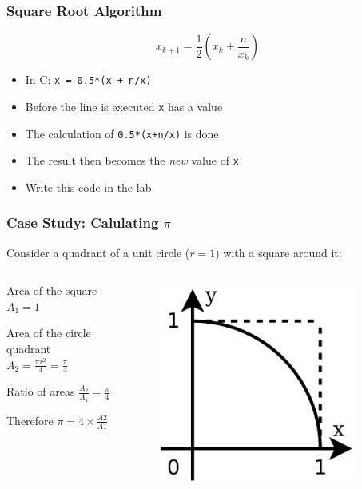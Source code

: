 \documentclass[14pt]{beamer}
\begin{document}
\begin{frame}
\frametitle{Square Root Algorithm}
\begin{equation}
x_{k+1} = \frac{1}{2}\left(x_k + \frac{n}{x_k}\right)
\end{equation}
\begin{itemize}
\item In C: \texttt{x = 0.5*(x + n/x)}
\item Before the line is executed \texttt{x} has a value
\item The calculation of \texttt{0.5*(x+n/x)} is done
\item The result then becomes the \textit{new} value of \texttt{x}
\item Write this code in the lab
\end{itemize}
\end{frame}

\begin{frame}
\frametitle{Case Study: Calulating $\pi$}
Consider a quadrant of a unit circle ($r=1$) with a square around it:
\begin{columns}
\begin{column}{0.5\textwidth}
\begin{itemize}
\small{
\item Area of the square $A_1 = 1$\\
\item Area of the circle quadrant $A_2 =\frac{\pi r^2}{4} = \frac{\pi}{4}$ \\
\item Ratio of areas $\frac{A_2}{A_1} = \frac{\pi}{4}$
\item Therefore $\pi = 4\times \frac{A2}{A1}$
}
\end{itemize}
\end{column}
\begin{column}{0.5\textwidth}
\begin{figure}
\includegraphics[width=0.9\textwidth]{pi.png}
\end{figure}
\end{column}
\end{columns}
\end{frame}
\end{document}

